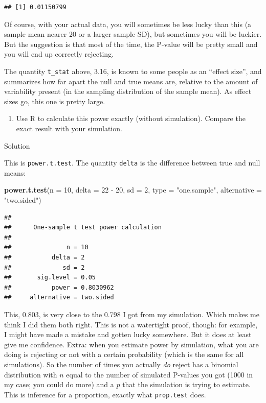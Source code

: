 \documentclass[]{tufte-book}
\newenvironment{Shaded}{}{}
\newcommand{\DataTypeTok}[1]{\textcolor[rgb]{0.56,0.13,0.00}{#1}}
\newcommand{\DecValTok}[1]{\textcolor[rgb]{0.25,0.63,0.44}{#1}}
\newcommand{\KeywordTok}[1]{\textcolor[rgb]{0.00,0.44,0.13}{\textbf{#1}}}
\newcommand{\NormalTok}[1]{#1}
\newcommand{\OperatorTok}[1]{\textcolor[rgb]{0.40,0.40,0.40}{#1}}
\newcommand{\StringTok}[1]{\textcolor[rgb]{0.25,0.44,0.63}{#1}}
\providecommand{\tightlist}{%
  \setlength{\itemsep}{0pt}\setlength{\parskip}{0pt}}
\theoremstyle{definition}
\theoremstyle{definition}
\theoremstyle{definition}
\theoremstyle{remark}
\begin{document}
\begin{verbatim}
## [1] 0.01150799
\end{verbatim}

Of course, with your actual data, you will sometimes be less lucky than
this (a sample mean nearer 20 or a larger sample SD), but sometimes you
will be luckier. But the suggestion is that most of the time, the
P-value will be pretty small and you will end up correctly rejecting.

The quantity \texttt{t\_stat} above, 3.16, is known to some people as an
``effect size'', and summarizes how far apart the null and true means
are, relative to the amount of variability present (in the sampling
distribution of the sample mean). As effect sizes go, this one is pretty
large.

\begin{enumerate}
\def\labelenumi{(\alph{enumi})}
\setcounter{enumi}{4}
\tightlist
\item
  Use R to calculate this power exactly (without simulation). Compare
  the exact result with your simulation.
\end{enumerate}

Solution

This is \texttt{power.t.test}. The quantity \texttt{delta} is the
difference between true and null means:

\begin{Shaded}
\begin{Highlighting}[]
\KeywordTok{power.t.test}\NormalTok{(}\DataTypeTok{n =} \DecValTok{10}\NormalTok{, }\DataTypeTok{delta =} \DecValTok{22} \OperatorTok{-}\StringTok{ }\DecValTok{20}\NormalTok{, }\DataTypeTok{sd =} \DecValTok{2}\NormalTok{, }
    \DataTypeTok{type =} \StringTok{"one.sample"}\NormalTok{, }\DataTypeTok{alternative =} \StringTok{"two.sided"}\NormalTok{)}
\end{Highlighting}
\end{Shaded}

\begin{verbatim}
## 
##      One-sample t test power calculation 
## 
##               n = 10
##           delta = 2
##              sd = 2
##       sig.level = 0.05
##           power = 0.8030962
##     alternative = two.sided
\end{verbatim}

This, 0.803, is very close to the 0.798 I got from my simulation. Which
makes me think I did them both right. This is not a watertight proof,
though: for example, I might have made a mistake and gotten lucky
somewhere. But it does at least give me confidence. Extra: when you
estimate power by simulation, what you are doing is rejecting or not
with a certain probability (which is the same for all simulations). So
the number of times you actually \emph{do} reject has a binomial
distribution with \(n\) equal to the number of simulated P-values you
got (1000 in my case; you could do more) and a \(p\) that the simulation
is trying to estimate. This is inference for a proportion, exactly what
\texttt{prop.test} does.
\end{document}
